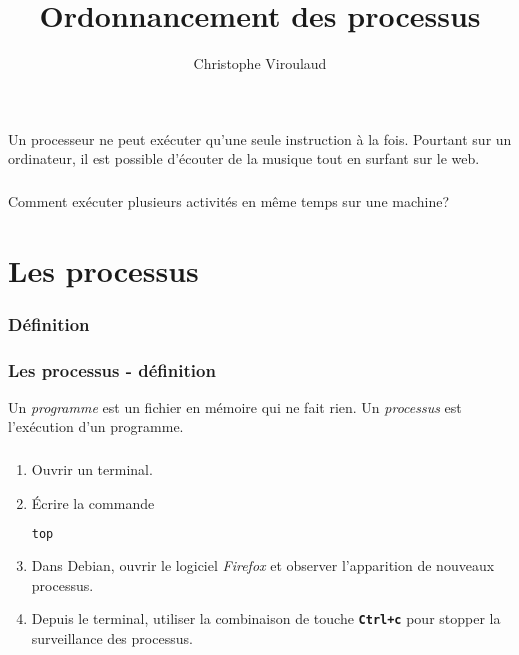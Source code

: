 \documentclass[svgnames,11pt]{beamer}
\author[]{Christophe Viroulaud}
\title{Ordonnancement des processus}
\date{\framebox{\textbf{Archi 02}}}
\institute{Terminale - NSI}
\begin{document}
\begin{frame}
\titlepage
\end{frame}
\begin{frame}
    \frametitle{}

    Un processeur ne peut exécuter qu'une seule instruction à la fois. Pourtant sur un ordinateur, il est possible d'écouter de la musique tout en surfant sur le web.

\end{frame}
\begin{frame}
    \frametitle{}

    \begin{framed}
        \centering Comment exécuter plusieurs activités en même temps sur une machine?
    \end{framed}

\end{frame}
\section{Les processus}
\subsubsection{Définition}
\begin{frame}
    \frametitle{Les processus - définition}

    \begin{aretenir}[]
        Un \emph{programme} est un fichier en mémoire qui ne fait rien. Un \emph{processus} est l'exécution d'un programme. 
    \end{aretenir}

\end{frame}
\begin{frame}[fragile]
    \frametitle{}

    \begin{activite}
    \begin{enumerate}
        \item Ouvrir un terminal.
        \item Écrire la commande
        \begin{center}
        \begin{lstlisting}[language=Bash , basicstyle=\ttfamily\small, xleftmargin=2em, xrightmargin=2em]
top
\end{lstlisting}
        \label{CODE}
        \end{center}
        \item Dans Debian, ouvrir le logiciel \emph{Firefox} et observer l'apparition de nouveaux processus.
        \item Depuis le terminal, utiliser la combinaison de touche \textbf{\texttt{Ctrl+c}} pour stopper la surveillance des processus.
    \end{enumerate}
    \end{activite}

\end{frame}
\end{document}
